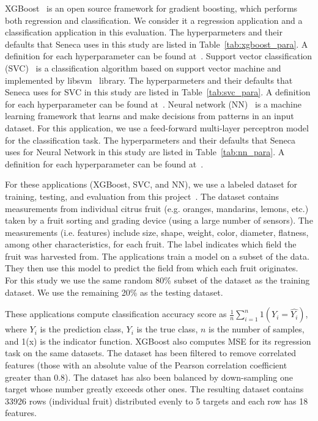 XGBoost~\cite{ref:xgboost-web} is an open source framework for gradient boosting, which 
performs both regression and classification. We consider it a regression application and
a classification application in this evaluation.  
The hyperparmeters and their defaults that Seneca uses in this study are listed in Table~\ref{tab:xgboost_para}. A definition for each hyperparameter can be found at~\cite{ref:xgboostparams}.
Support vector classification (SVC)~\cite{ref:svc} is a classification algorithm 
based on support vector machine and implemented by libsvm~\cite{ref:libsvm} library.
The hyperparmeters and their defaults that Seneca uses for SVC in this study are listed in Table~\ref{tab:svc_para}. A definition for each hyperparameter can be found at~\cite{ref:svcparams}.
Neural network (NN)~\cite{ref:neural_network} is a machine learning framework that learns 
and make decisions from patterns in an input dataset. For this application, 
we use a feed-forward multi-layer perceptron model~\cite{ref:feedforward_nn} 
for the classification task.
The hyperparmeters and their defaults that Seneca uses for Neural Network in this study are listed in Table~\ref{tab:nn_para}. A definition for each hyperparameter can be found at~\cite{ref:nnparams}.

For these applications (XGBoost, SVC, and NN), we use a labeled
dataset for training, testing, and evaluation from this
project~\cite{iot-cpu}. The dataset contains measurements from individual
citrus fruit (e.g. oranges, mandarins, lemons, etc.) taken by a fruit sorting
and grading device (using a large number of sensors).  The measurements (i.e.
features) include size, shape, weight, color, diameter, flatness, among other
characteristics, for each fruit.  The label indicates which field the fruit
was harvested from.  The applications train a model on a subset of the
data.  They then use this model to predict the field
from which each fruit originates. For this study we use the same random 80\%
subset of the dataset as the training dataset.  We use the remaining 20\% as the
testing dataset.

These applications compute classification accuracy score
as $\frac{1}{n}\sum_{i=1}^{n}1(Y_i = \hat{Y_i})$, where $Y_i$ is the
prediction class, $Y_i$ is the true class, $n$ is the number of samples, and 1(x)
is the indicator function. XGBoost also computes MSE for its regression task
on the same datasets. The dataset has been filtered to remove correlated
features (those with an absolute value of the Pearson correlation coefficient
greater than 0.8). The dataset has also been balanced by down-sampling one
target whose number greatly exceeds other ones. The resulting dataset contains
33926 rows (individual fruit) distributed evenly to 5 targets and each row has
18 features.

